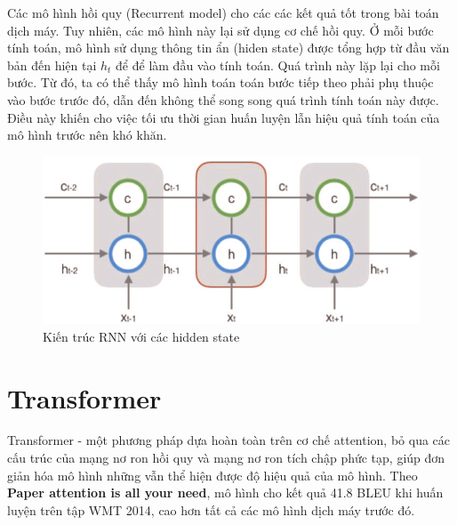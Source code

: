 Các mô hình hồi quy (Recurrent model) cho các các kết quả tốt trong bài toán dịch máy. Tuy nhiên, các mô hình này lại sử dụng cơ chế hồi quy. Ở mỗi bước tính toán, mô hình sử dụng thông tin ẩn (hiden state) được tổng hợp từ đầu văn bản đến hiện tại $h_t$ để để làm đầu vào tính toán. Quá trình này lặp lại cho mỗi bước. Từ đó, ta có thể thấy mô hình toán toán bước tiếp theo phải phụ thuộc vào bước trước đó, dẫn đến không thể song song quá trình tính toán này được. Điều này khiến cho việc tối ưu thời gian huấn luyện lẫn hiệu quả tính toán của mô hình trước nên khó khăn.

\begin{figure}[H]
    \begin{center}
        \includegraphics[scale=0.6]{images/hidden-state}
        \caption{Kiến trúc RNN với các hidden state}
        \label{fig:hidden state}
    \end{center}
\end{figure}


\section{Transformer}

Transformer - một phương pháp dựa hoàn toàn trên cơ chế attention, bỏ qua các cấu trúc của mạng nơ ron hồi quy và mạng nơ ron tích chập phức tạp, giúp đơn giản hóa mô hình những vẫn thể hiện được độ hiệu quả của mô hình. Theo \textbf{Paper attention is all your need}, mô hình cho kết quả 41.8 BLEU khi huấn luyện trên tập WMT 2014, cao hơn tất cả các mô hình dịch máy trước đó. 

